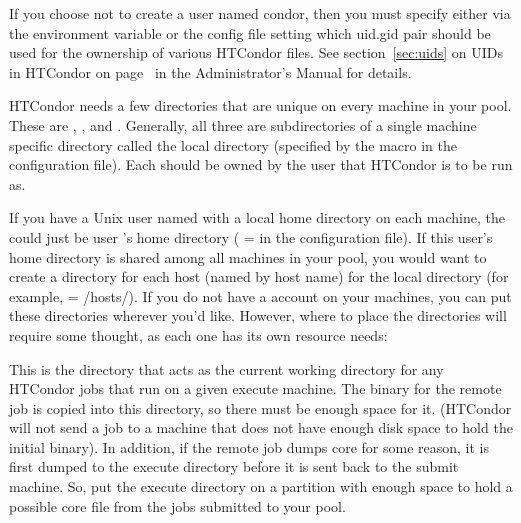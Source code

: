 \begin{description}
If you choose not to create a user named condor,
then you must specify either via the
 environment variable or the 
config file setting which uid.gid pair should be used for
the ownership of various HTCondor files.  
See section~\ref{sec:uids} on UIDs in HTCondor on
page~\pageref{sec:uids} in the Administrator's Manual for details.

\item[6. Where should the machine-specific directories for
HTCondor go?]

HTCondor needs a few directories that are unique on every machine in
your pool.  These are 
, 
, and 
.  Generally, all
three are subdirectories of a single machine specific directory called
the local directory (specified by the  macro
in the configuration file).
Each should be owned by the user that HTCondor is to be run as.

If you have a Unix user named  with a local home directory on each
machine, the  could just be user 's home
directory ( =  in the 
configuration file).
If this user's home directory is shared among all machines in your
pool, you would want to create a directory for each host (named by
host name) for the local directory (for example,  =
/hosts/).  If you do not
have a  account on your machines, you can put these directories
wherever you'd like.
However, where to place the directories will require some
thought, as each one has its own resource needs:

\begin{description}
\item[\File{execute}] This is the directory that acts as the current working
directory for any HTCondor jobs that run on a given execute machine.
The binary for the remote job is copied into this directory, so
there
must be enough space for it.  (HTCondor will not send a job to a
machine that does not have enough disk space to hold the initial
binary).  In addition, if the remote job dumps core for some reason,
it is first dumped to the execute directory before it is sent back to
the submit machine.  So, put the execute directory on
a partition with enough space to hold a possible core file from the
jobs submitted to your pool.


\end{description}
\end{description}
